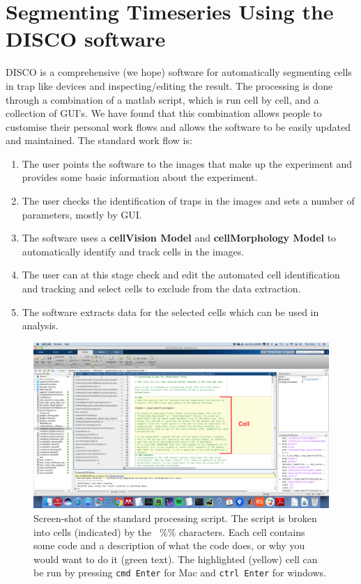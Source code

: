 \section{Segmenting Timeseries Using the DISCO software}
\label{sec:segmenting_timeseries}
DISCO is a comprehensive (we hope) software for automatically segmenting cells in trap like devices and inspecting/editing the result. The processing is done through a combination of a matlab script, which is run cell by cell, and a collection of GUI's. We have found that this combination allows people to customise their personal work flows and allows the software to be easily updated and maintained. The standard work flow is:
\begin{enumerate}
	\item The user points the software to the images that make up the experiment and provides some basic information about the experiment.
	\item The user checks the identification of traps in the images and sets a number of parameters, mostly by GUI.
	\item The software uses a \textbf{cellVision Model} and \textbf{cellMorphology Model} to automatically identify and track cells in the images.
	\item The user can at this stage check and edit the automated cell identification and tracking and select cells to exclude from the data extraction.
	\item The software extracts data for the selected cells which can be used in analysis.
\end{enumerate}
\begin{figure}
\centering
\includegraphics[width=1\linewidth]{documentation_images/standard_script_screen}
\caption[Screen-shot of the standard processing script.]{Screen-shot of the standard processing script. The script is broken into cells (indicated) by the \texttt{ $\% \%$} characters. Each cell contains some code and a description of what the code does, or why you would want to do it (green text). The highlighted (yellow) cell can be run by pressing \texttt{cmd Enter} for Mac and \texttt{ctrl Enter} for windows.}
\label{fig:standard_script_screen}
\end{figure}
